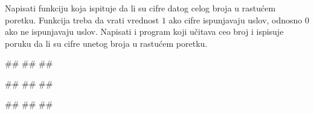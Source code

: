 \begin{Exercise}[label=p1.4_14] 
Napisati funkciju  koja ispituje da li su
cifre datog celog broja u rastućem poretku. Funkcija treba da vrati
vrednost $1$ ako cifre ispunjavaju uslov, odnosno $0$ ako ne
ispunjavaju uslov. Napisati i program koji učitava ceo broj i ispisuje
poruku da li su cifre unetog broja u rastućem poretku.

\begin{miditest}
\begin{upotreba}{1}
#\naslovInt#
##
##
\end{upotreba}
\end{miditest}
\begin{miditest}
\begin{upotreba}{2}
#\naslovInt#
##
##
\end{upotreba}
\end{miditest}

\begin{miditest}
\begin{upotreba}{3}
#\naslovInt#
##
##
\end{upotreba}
\end{miditest}

\end{Exercise}
\ifresenja 
\begin{Answer}[ref=p1.4_14]
\end{Answer} 
\fi



